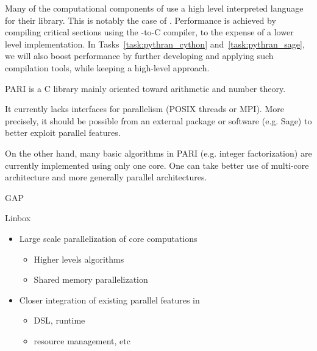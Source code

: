 \begin{Workpackage}{\thewpno}
\begin{WPDescription}

  Many of the computational components of \TheProject use a high level
  interpreted language for their library. This is notably the case of
  \Sage. Performance is achieved by compiling critical sections using
  the \Cython \Python-to-C compiler, to the expense of a lower level
  implementation. In Tasks~\ref{task:pythran_cython}
  and~\ref{task:pythran_sage}, we will also boost performance by
  further developing and applying such compilation tools, while
  keeping a high-level approach.

\end{WPDescription}

\begin{task}{PARI}
  \label{task:hpc_pari}
  \Pari is a C library mainly oriented toward arithmetic and number theory.
  
  It currently lacks interfaces for parallelism (POSIX threads or
  MPI). More precisely, it should be possible from an external package
  or software (e.g. Sage) to better exploit \Pari parallel features.

  On the other hand, many basic algorithms in PARI (e.g. integer
  factorization) are currently implemented using only one core. One can
  take better use of multi-core architecture and more generally parallel
  architectures.
\end{task}

\begin{task}{GAP}
  \label{task:hpc_gap}

\end{task}

\begin{task}{Linbox}
  \label{task:hpc_linbox}

  \begin{itemize}
  \item Large scale parallelization of core computations
    \begin{itemize}
    \item Higher levels algorithms
    \item Shared memory parallelization
    \end{itemize}
  \item Closer integration of existing parallel features in \Sage
    \begin{itemize}
    \item DSL, runtime
    \item resource management, etc
    \end{itemize}
  \end{itemize}


\end{task}
\end{Workpackage}
